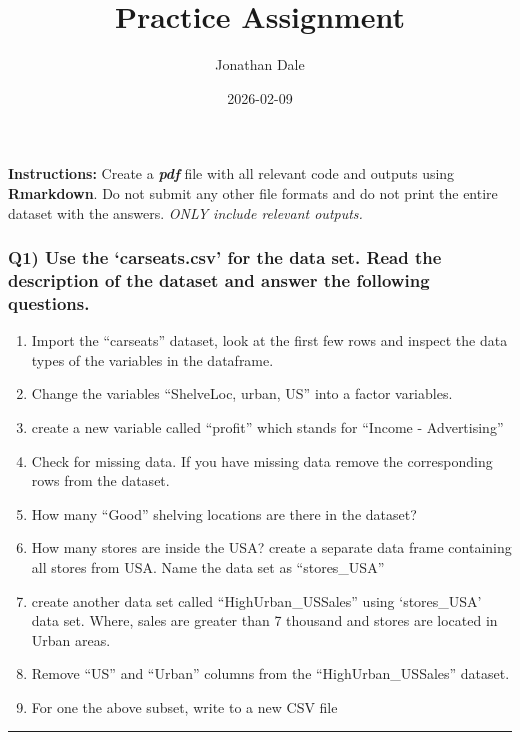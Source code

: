 \documentclass[
]{article}
\title{Practice Assignment}
\author{Jonathan Dale}
\date{2026-02-09}
\providecommand{\tightlist}{%
  \setlength{\itemsep}{0pt}\setlength{\parskip}{0pt}}
\begin{document}
\maketitle

\textbf{Instructions:} Create a \textbf{\emph{pdf}} file with all
relevant code and outputs using \textbf{Rmarkdown}. Do not submit any
other file formats and do not print the entire dataset with the answers.
\emph{ONLY include relevant outputs.}

\subsubsection{Q1) Use the `carseats.csv' for the data set. Read the
description of the dataset and answer the following
questions.}\label{q1-use-the-carseats.csv-for-the-data-set.-read-the-description-of-the-dataset-and-answer-the-following-questions.}

\begin{enumerate}
\def\labelenumi{\alph{enumi})}
\tightlist
\item
  Import the ``carseats'' dataset, look at the first few rows and
  inspect the data types of the variables in the dataframe.
\item
  Change the variables ``ShelveLoc, urban, US'' into a factor variables.
\item
  create a new variable called ``profit'' which stands for ``Income -
  Advertising''
\item
  Check for missing data. If you have missing data remove the
  corresponding rows from the dataset.
\item
  How many ``Good'' shelving locations are there in the dataset?
\item
  How many stores are inside the USA? create a separate data frame
  containing all stores from USA. Name the data set as ``stores\_USA''
\item
  create another data set called ``HighUrban\_USSales'' using
  `stores\_USA' data set. Where, sales are greater than 7 thousand and
  stores are located in Urban areas.
\item
  Remove ``US'' and ``Urban'' columns from the ``HighUrban\_USSales''
  dataset.
\item
  For one the above subset, write to a new CSV file
\end{enumerate}

\begin{center}\rule{0.5\linewidth}{0.5pt}\end{center}
\end{document}
